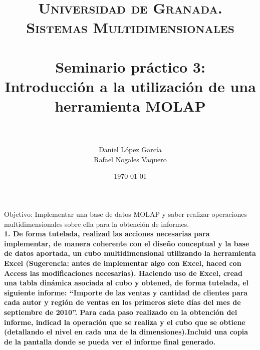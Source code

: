 \documentclass[paper=a4, fontsize=11pt, spanish]{scrartcl}
\title{
  \normalfont \normalsize 
  \textsc{Universidad de Granada.\\Sistemas Multidimensionales} \\ [25pt] %
  \horrule{0.5pt} \\[0.4cm] %
  \huge Seminario práctico 3: \\Introducción a la utilización de una herramienta MOLAP \\ %
  \horrule{2pt} \\[0.5cm] %
}
\author{Daniel López García\\Rafael Nogales Vaquero} %
\date{\normalsize\today} %
\numberwithin{equation}{section} %
\numberwithin{figure}{section} %
\numberwithin{table}{section} %
\begin{document}
\maketitle %
Objetivo: Implementar una base de datos MOLAP y saber realizar operaciones multidimensionales sobre ella para la obtención de informes.\\

\textbf{1. De forma tutelada, realizad las acciones necesarias para implementar, de manera coherente con el diseño conceptual y la base de datos aportada, un cubo multidimensional utilizando la herramienta Excel (Sugerencia: antes de implementar algo con Excel, haced con Access las modificaciones necesarias). Haciendo uso de Excel, cread una tabla dinámica asociada al cubo y obtened, de forma tutelada, el siguiente informe: “Importe de las ventas y cantidad de clientes para cada autor y región de ventas en los primeros siete días del mes de septiembre de 2010”.
Para cada paso realizado en la obtención del informe, indicad la operación que se realiza y el cubo que se obtiene (detallando el nivel en cada una de la dimensiones).Incluid una copia de la pantalla donde se pueda ver el informe final generado.}\medskip
\end{document}
